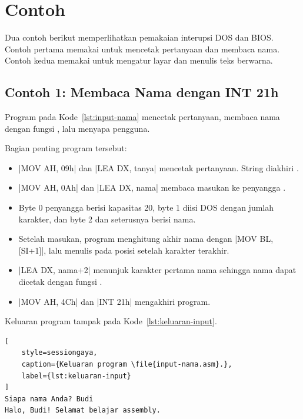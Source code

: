 \section{Contoh}
\label{sec:contoh-bab9}

Dua contoh berikut memperlihatkan pemakaian interupsi DOS dan BIOS.
Contoh pertama memakai  untuk mencetak pertanyaan dan
membaca nama. Contoh kedua memakai  untuk mengatur
layar dan menulis teks berwarna.

\subsection{Contoh 1: Membaca Nama dengan INT 21h}

Program pada Kode~\ref{lst:input-nama} mencetak pertanyaan,
membaca nama dengan fungsi , lalu menyapa pengguna.



Bagian penting program tersebut:

\begin{itemize}
    \item \lstasm|MOV AH, 09h| dan \lstasm|LEA DX, tanya| mencetak
          pertanyaan. String diakhiri .
    \item \lstasm|MOV AH, 0Ah| dan \lstasm|LEA DX, nama| membaca
          masukan ke penyangga .
    \item Byte 0 penyangga berisi kapasitas 20, byte 1 diisi DOS
          dengan jumlah karakter, dan byte 2 dan seterusnya berisi
          nama.
    \item Setelah masukan, program menghitung akhir nama dengan
          \lstasm|MOV BL, [SI+1]|, lalu menulis  pada
          posisi setelah karakter terakhir.
    \item \lstasm|LEA DX, nama+2| menunjuk karakter pertama nama
          sehingga nama dapat dicetak dengan fungsi .
    \item \lstasm|MOV AH, 4Ch| dan \lstasm|INT 21h| mengakhiri
          program.
\end{itemize}

Keluaran program tampak pada Kode~\ref{lst:keluaran-input}.

\begin{lstlisting}[
    style=sessiongaya,
    caption={Keluaran program \file{input-nama.asm}.},
    label={lst:keluaran-input}
]
Siapa nama Anda? Budi
Halo, Budi! Selamat belajar assembly.
\end{lstlisting}

